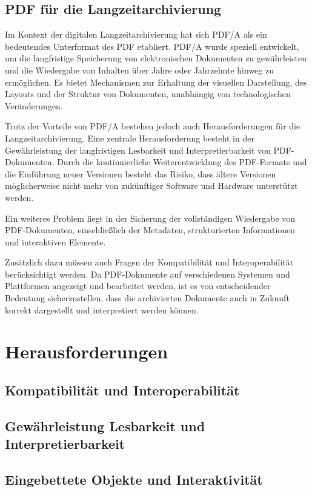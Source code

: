 \documentclass[a4paper,oneside, 12pt]{report}
\begin{document}
\section{PDF für die Langzeitarchivierung}
Im Kontext der digitalen Langzeitarchivierung hat sich \ac{PDF/A} als ein bedeutendes Unterformat des \ac{PDF} etabliert. \ac{PDF/A} wurde speziell entwickelt, um die langfristige Speicherung von elektronischen Dokumenten zu gewährleisten und die Wiedergabe von Inhalten über Jahre oder Jahrzehnte hinweg zu ermöglichen. Es bietet Mechanismen zur Erhaltung der visuellen Darstellung, des Layouts und der Struktur von Dokumenten, unabhängig von technologischen Veränderungen.

Trotz der Vorteile von \ac{PDF/A} bestehen jedoch auch Herausforderungen für die Langzeitarchivierung. Eine zentrale Herausforderung besteht in der Gewährleistung der langfristigen Lesbarkeit und Interpretierbarkeit von \ac{PDF}-Dokumenten. Durch die kontinuierliche Weiterentwicklung des \ac{PDF}-Formats und die Einführung neuer Versionen besteht das Risiko, dass ältere Versionen möglicherweise nicht mehr von zukünftiger Software und Hardware unterstützt werden.

Ein weiteres Problem liegt in der Sicherung der vollständigen Wiedergabe von \ac{PDF}-Dokumenten, einschließlich der Metadaten, strukturierten Informationen und interaktiven Elemente.

Zusätzlich dazu müssen auch Fragen der Kompatibilität und Interoperabilität berücksichtigt werden. Da \ac{PDF}-Dokumente auf verschiedenen Systemen und Plattformen angezeigt und bearbeitet werden, ist es von entscheidender Bedeutung sicherzustellen, dass die archivierten Dokumente auch in Zukunft korrekt dargestellt und interpretiert werden können.


\chapter{Herausforderungen}\label{sec:herausforderungen}
\section{Kompatibilität und Interoperabilität}
\section{Gewährleistung Lesbarkeit und Interpretierbarkeit}
\section{Eingebettete Objekte und Interaktivität}
\end{document}
